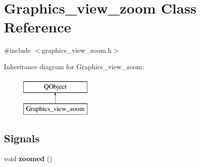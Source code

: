 \hypertarget{class_graphics__view__zoom}{}\section{Graphics\+\_\+view\+\_\+zoom Class Reference}
\label{class_graphics__view__zoom}


{\ttfamily \#include $<$graphics\+\_\+view\+\_\+zoom.\+h$>$}

Inheritance diagram for Graphics\+\_\+view\+\_\+zoom\+:\begin{figure}[H]
\begin{center}
\leavevmode
\includegraphics[height=2.000000cm]{class_graphics__view__zoom}
\end{center}
\end{figure}
\subsection*{Signals}
\begin{DoxyCompactItemize}
\item 
\mbox{\label{class_graphics__view__zoom_ad45f966c8ce40978e52f187880b240ed}} 
void {\bfseries zoomed} ()
\end{DoxyCompactItemize}
